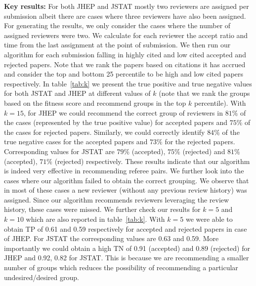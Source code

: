 {\bf Key results:}  
For both JHEP and JSTAT mostly two reviewers are assigned per submission albeit there are cases where three reviewers have also been assigned. 
For generating the results, we only consider the cases where the number of assigned reviewers were two. We calculate for each reviewer the accept ratio and time from the last assignment at the point of submission. 
We then run our algorithm for each submission falling in highly cited and low cited accepted and rejected papers. 
Note that we rank the papers based on citations it has accrued and consider the top and bottom 25 percentile 
to be high and low cited papers respectively. 
In table~\ref{tab:k} we present the true positive and true negative values for both JSTAT and JHEP at different values of $k$ (note that we rank the groups based 
on the fitness score and recommend groups in the top $k$ percentile). 
With $k = 15$, for JHEP we could recommend the correct group of reviewers in $81\%$ 
of the cases (represented by the true positive value) for accepted papers and $75\%$ of the cases for rejected papers. Similarly, we could correctly identify $84\%$ of the true negative cases for the accepted papers and $73\%$ for the rejected papers. Corresponding values for JSTAT are 
$79\%$ (accepted), $75\%$ (rejected) and $81\%$ (accepted), $71\%$ (rejected) respectively. %
These results indicate that our algorithm is indeed very effective in recommending referee pairs. We further look into the cases where 
our algorithm failed to obtain the correct grouping. We observe that in most of these cases a new reviewer (without any previous review history) was assigned. 
Since our algorithm recommends reviewers leveraging the review history, these cases were missed.
We further check our results for $k=5$ and $k=10$ which are also reported in 
table~\ref{tab:k}. With $k=5$ we were able to obtain TP of 0.61 and 0.59 respectively for accepted and rejected papers in case of JHEP. For JSTAT the corresponding values 
are 0.63 and 0.59. More importantly we could obtain a high TN of 0.91 (accepted) and 0.89 (rejected) for JHEP and 0.92, 0.82 for JSTAT. This is because we are 
recommending a smaller number of groups which reduces the possibility of recommending a particular undesired/desired group.



